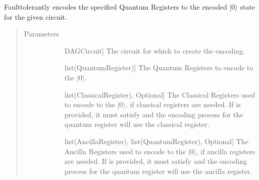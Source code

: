 \documentclass[letterpaper,10pt,english]{sphinxmanual}
\begin{document}
\begin{fulllineitems}
\begin{fulllineitems}
\begin{quote}
\begin{description}
\begin{description}
\end{description}

\end{description}\end{quote}

\end{fulllineitems}


\begin{fulllineitems}
\label{\detokenize{Steane:Steane.SteaneFaultTolerantEncoder.getEncoderCircuit}}
Fault\sphinxhyphen{}tolerantly encodes the specified Quantum Registers to the encoded \(|0\rangle\) state for the given circuit.
\begin{quote}\begin{description}
\item[{Parameters}] \leavevmode\begin{description}
\item[{}] \leavevmode{[}DAGCircuit{]}
The circuit for which to create the encoding.

\item[{}] \leavevmode{[}list(QuantumRegister){]}
The Quantum Registers to encode to the \(|0\rangle\).

\item[{}] \leavevmode{[}list(ClassicalRegister), Optional{]}
The Classical Registers used to encode to the \(|0\rangle\), if classical registers are needed. If  is provided, it must satisfy  and the encoding process for the  quantum register will use the  classical register.

\item[{}] \leavevmode{[}list(AncillaRegister), list(QuantumRegister), Optional{]}
The Ancilla Registers used to encode to the \(|0\rangle\), if ancilla registers are needed. If  is provided, it must satisfy  and the encoding process for the  quantum register will use the  ancilla register.


\end{description}
\end{description}
\end{quote}
\end{fulllineitems}
\end{fulllineitems}
\end{document}
